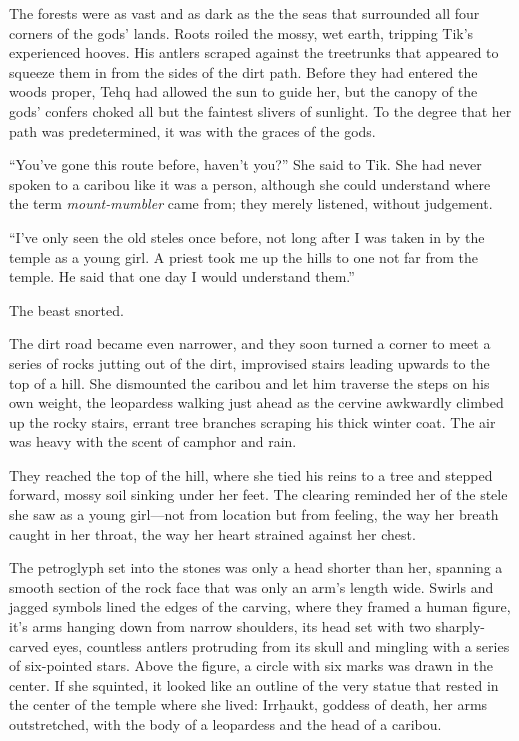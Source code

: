 The forests were as vast and as dark as the the seas that surrounded all four corners of the gods' lands. Roots roiled the mossy, wet earth, tripping Tik's experienced hooves. His antlers scraped against the treetrunks that appeared to squeeze them in from the sides of the dirt path. Before they had entered the woods proper, Tehq had allowed the sun to guide her, but the canopy of the gods' confers choked all but the faintest slivers of sunlight. To the degree that her path was predetermined, it was with the graces of the gods.

``You've gone this route before, haven't you?'' She said to Tik. She had never spoken to a caribou like it was a person, although she could understand where the term \emph{mount-mumbler} came from; they merely listened, without judgement.

``I've only seen the old steles once before, not long after I was taken in by the temple as a young girl. A priest took me up the hills to one not far from the temple. He said that one day I would understand them.''

The beast snorted.

The dirt road became even narrower, and they soon turned a corner to meet a series of rocks jutting out of the dirt, improvised stairs leading upwards to the top of a hill. She dismounted the caribou and let him traverse the steps on his own weight, the leopardess walking just ahead as the cervine awkwardly climbed up the rocky stairs, errant tree branches scraping his thick winter coat. The air was heavy with the scent of camphor and rain.

They reached the top of the hill, where she tied his reins to a tree and stepped forward, mossy soil sinking under her feet. The clearing reminded her of the stele she saw as a young girl---not from location but from feeling, the way her breath caught in her throat, the way her heart strained against her chest.

The petroglyph set into the stones was only a head shorter than her, spanning a smooth section of the rock face that was only an arm's length wide. Swirls and jagged symbols lined the edges of the carving, where they framed a human figure, it's arms hanging down from narrow shoulders, its head set with two sharply-carved eyes, countless antlers protruding from its skull and mingling with a series of six-pointed stars. Above the figure, a circle with six marks was drawn in the center. If she squinted, it looked like an outline of the very statue that rested in the center of the temple where she lived: Irrḫaukt, goddess of death, her arms outstretched, with the body of a leopardess and the head of a caribou.

